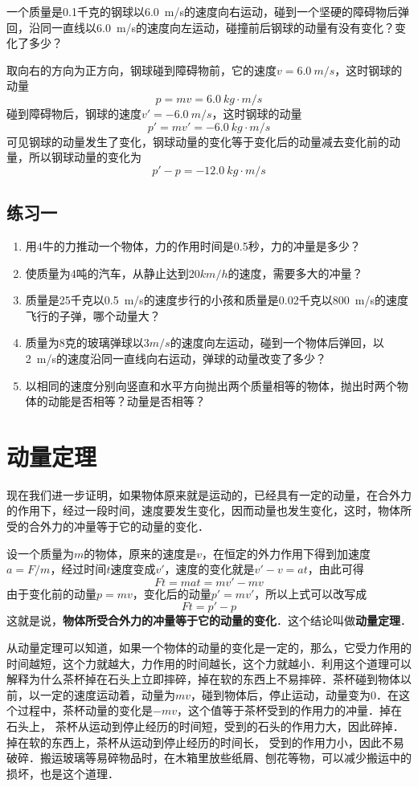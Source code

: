 \begin{example}
    一个质量是0.1千克的钢球以\qty{6.0}{m/s}的速度向右运动，碰到一个坚硬的障碍物后弹回，沿同一直线以\qty{6.0}{m/s}的速度向左运动，碰撞前后钢球的动量有没有变化？变化了多少？
\end{example}


\begin{solution}
    取向右的方向为正方向，钢球碰到障碍物前，它的速度$v=\qty{6.0}{m/s}$，这时钢球的动量
    \[p=mv=\qty{6.0}{kg\cdot m/s}\]
    碰到障碍物后，钢球的速度$v'=\qty{-6.0}{m/s}$，这时钢球的动量
    \[p'=mv'=\qty{-6.0}{kg\cdot m/s}\]
    可见钢球的动量发生了变化，钢球动量的变化等于变化后的动量减去变化前的动量，所以钢球动量的变化为
    \[p'-p=\qty{-12.0}{kg\cdot m/s} \]
\end{solution}
\subsection*{练习一}
\begin{enumerate}
    \item 用4牛的力推动一个物体，力的作用时间是0.5秒，力的冲量是多少？
    \item 使质量为4吨的汽车，从静止达到20$\si{km/h}$的速度，需要多大的冲量？
    \item 质量是25千克以\qty{0.5}{m/s}的速度步行的小孩和质量是0.02千克以\qty{800}{m/s}的速度飞行的子弹，哪个动量大？
    \item 质量为8克的玻璃弹球以3$\si{m/s}$的速度向左运动，碰到一个物体后弹回，以\qty{2}{m/s}的速度沿同一直线向右运动，弹球的动量改变了多少？
    \item 以相同的速度分别向竖直和水平方向抛出两个质量相等的物体，抛出时两个物体的动能是否相等？动量是否相等？
\end{enumerate}
\newpage
\section{动量定理}
现在我们进一步证明，如果物体原来就是运动的，已经具有一定的动量，在合外力的作用下，经过一段时间，速度要发生变化，因而动量也发生变化，这时，物体所受的合外力的冲量等于它的动量的变化．

设一个质量为$m$的物体，原来的速度是$v$，在恒定的外力作用下得到加速度$a=F/m$，经过时间$t$速度变成$v'$，速度的变化就是$v'-v=at$，由此可得
\[Ft=mat=mv'-mv\]
由于变化前的动量$p=mv$，变化后的动量$p'=mv'$，所以上式可以改写成
\[Ft=p'-p\]
这就是说，\textbf{物体所受合外力的冲量等于它的动量的变化}．这个结论叫做\textbf{动量定理}．

从动量定理可以知道，如果一个物体的动量的变化是一定的，那么，它受力作用的时间越短，这个力就越大，力作用的时间越长，这个力就越小．利用这个道理可以解释为什么茶杯掉在石头上立即摔碎，掉在软的东西上不易摔碎．茶杯碰到物体以前，以一定的速度运动着，动量为$mv$，碰到物体后，停止运动，动量变为0．在这个过程中，茶杯动量的变化是$-mv$，这个值等于茶杯受到的作用力的冲量．掉在石头上，
茶杯从运动到停止经历的时间短，受到的石头的作用力大，因此碎掉．掉在软的东西上，茶杯从运动到停止经历的时间长，
受到的作用力小，因此不易破碎．搬运玻璃等易碎物品时，在木箱里放些纸屑、刨花等物，可以减少搬运中的损坏，也是这个道理．

